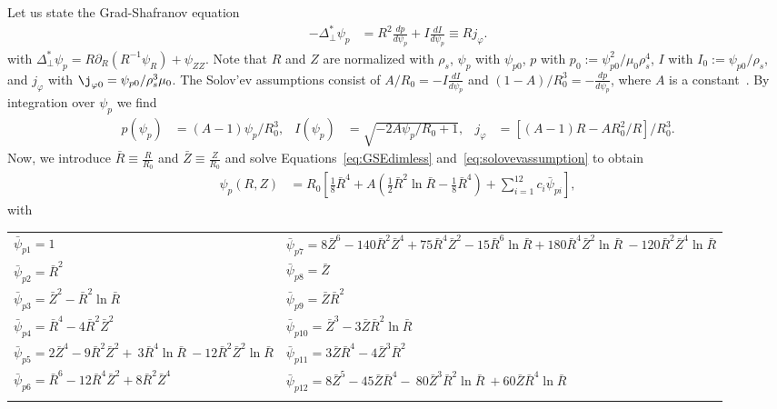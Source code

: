 Let us state the Grad-Shafranov equation
\begin{align}\label{eq:GSEdimless}
 -\Delta^*_\perp  \psi_p &= R^2 \frac{d p}{d  \psi_p } + I \frac{d I}{d  \psi_p }\equiv R j_\varphi.
\end{align}
with $\Delta^*_\perp \psi_p = R\partial_R (R^{-1}\psi_R) + \psi_{ZZ}$.
Note that $R$ and $Z$ are normalized
with $\rho_s$, $\psi_p$ with $\psi_{p0}$, $p$ with
$p_0 := \psi_{p0}^2/\mu_0\rho_s^4$, $I$ with $I_0:=\psi_{p0}/\rho_s$,
and $j_\varphi$ with $\j_{\varphi 0} = \psi_{p0}/\rho_s^3\mu_0$.
The Solov'ev assumptions consist of \(A/R_0 = -I \frac{d I}{d  \psi_p }\) and \((1-A)/R_0^3 = -\frac{d p}{d  \psi_p }\), where \(A\) is a constant~\cite{Cerfon2010,Cerfon2014}.
By integration over \(\psi_p\) we find
\begin{align}\label{eq:solovevassumption}
 p(\psi_p) &= (A-1)\psi_p/R_0^3,  &
 I(\psi_p) &= \sqrt{-2 A \psi_p/R_0 + 1}, &
 j_\varphi &= \left[(A-1)R - A R_0^2 / R\right]/R_0^3.
\end{align}
Now, we introduce \(\bar{R} \equiv \frac{R}{R_0}\) and \(\bar{Z} \equiv\frac{Z}{R_0}\)
and solve Equations~\eqref{eq:GSEdimless} and~\eqref{eq:solovevassumption} to obtain
\begin{align}
 \psi_p (R,Z) &= R_0 \left[ \frac{1}{8}\bar{R}^4 + A\left( \frac{1}{2} \bar{R}^2 \ln{\bar{R}} 
   - \frac{1}{8}\bar{R}^4\right) + \sum_{i=1}^{12} c_{i}  \bar{\psi}_{pi}\right],
\end{align}
with
\begin{longtable}{>{\RaggedRight}p{7cm}>{\RaggedRight}p{7cm}}
\toprule
  $\bar{\psi}_{p1}=1$
  & $\bar{\psi}_{p7}=8\bar{Z}^6 -140 \bar{R}^2 \bar{Z}^4
                      + 75 \bar{R}^4 \bar{Z}^2 - 15\bar{R}^6\ln{\bar{R}}+ 180 \bar{R}^4 \bar{Z}^2 \ln{\bar{R}} \
                       -120 \bar{R}^2 \bar{Z}^4 \ln{\bar{R}}$\\
%
  $\bar{\psi}_{p2}=\bar{R}^2$ &
  $\bar{\psi}_{p8}=\bar{Z}$ \\
%
  $\bar{\psi}_{p3}=\bar{Z}^2 - \bar{R}^2 \ln{\bar{R}}$ &
  $\bar{\psi}_{p9}=\bar{Z}  \bar{R}^2$\\
%
  $\bar{\psi}_{p4}=\bar{R}^4 -4\bar{R}^2\bar{Z}^2$ &
  $\bar{\psi}_{p10}=\bar{Z}^3 - 3 \bar{Z} \bar{R}^2 \ln{\bar{R}}$\\
  $\bar{\psi}_{p5}=2\bar{Z}^4 - 9 \bar{R}^2\bar{Z}^2 + \
                     3 \bar{R}^4 \ln{\bar{R}} \
                    -12  \bar{R}^2\bar{Z}^2 \ln{\bar{R}}$
  &
$\bar{\psi}_{p11}=3 \bar{Z}\bar{R}^4 - 4\bar{Z}^3\bar{R}^2$\\
%
  $\bar{\psi}_{p6}=\bar{R}^6 -12 \bar{R}^4 \bar{Z}^2
                     + 8  \bar{R}^2 \bar{Z}^4$ &
  $\bar{\psi}_{p12}= 8 \bar{Z}^5 -45 \bar{Z} \bar{R}^4 - \
                       80 \bar{Z}^3 \bar{R}^2\ln{\bar{R}} \
                       +60 \bar{Z} \bar{R}^4\ln{\bar{R}}$ \\
   & \\
\bottomrule
\end{longtable}
